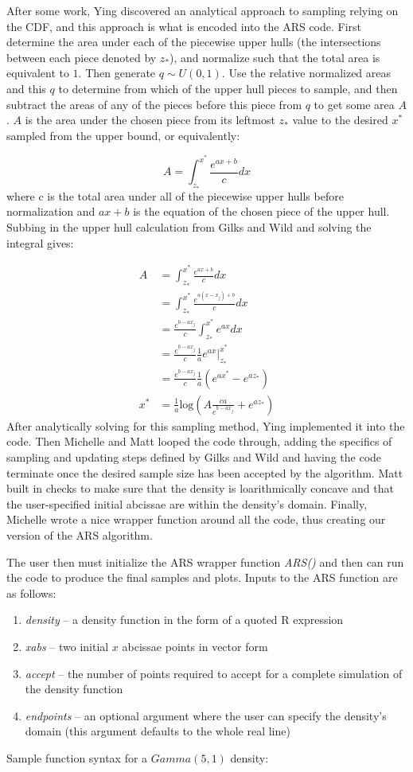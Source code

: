 \documentclass{article}
\begin{document}
After some work, Ying discovered an analytical approach to sampling relying on the CDF, and this approach is what is encoded into the ARS code.  First determine the area under each of the piecewise upper hulls (the intersections between each piece denoted by $z_*$), and normalize such that the total area is equivalent to $1$.  Then generate $q\sim U\left(0, 1\right)$.  Use the relative normalized areas and this $q$ to determine from which of the upper hull pieces to sample, and then subtract the areas of any of the pieces before this piece from $q$ to get some area $A$.  $A$ is the area under the chosen piece from its leftmost $z_*$ value to the desired $x^*$ sampled from the upper bound, or equivalently:

$$A=\int_{z_*}^{x^*}\frac{e^{ax+b}}{c}dx$$
where c is the total area under all of the piecewise upper hulls before normalization and $ax+b$ is the equation of the chosen piece of the upper hull.  Subbing in the upper hull calculation from Gilks and Wild and solving the integral gives:

\begin{align*}
A &= \int_{z_*}^{x^*}\frac{e^{ax+b}}{c}dx\\
&= \int_{z_*}^{x^*}\frac{e^{a\left(x-x_j\right)+b}}{c}dx\\
&= \frac{e^{b-ax_j}}{c}\int_{z_*}^{x^*}e^{ax}dx\\
&= \frac{e^{b-ax_j}}{c}\frac{1}{a}\left.e^{ax}\right|_{z_*}^{x^*}\\
&= \frac{e^{b-ax_j}}{c}\frac{1}{a}\left(e^{ax^*} - e^{az_*}\right)\\
x^* &= \frac{1}{a}\text{log}\left(A\frac{ca}{e^{b-ax_j}}+e^{az_*}\right)
\end{align*}
After analytically solving for this sampling method, Ying implemented it into the code.  Then Michelle and Matt looped the code through, adding the specifics of sampling and updating steps defined by Gilks and Wild and having the code terminate once the desired sample size has been accepted by the algorithm.  Matt built in checks to make sure that the density is loarithmically concave and that the user-specified initial abcissae are within the density's domain.  Finally, Michelle wrote a nice wrapper function around all the code, thus creating our version of the ARS algorithm.

The user then must initialize the ARS wrapper function \textit{ARS()} and then can run the code to produce the final samples and plots. Inputs to the ARS function are as follows:
\begin{enumerate}
\item \textit{density} -- a density function in the form of a quoted R expression
\item \textit{xabs} -- two initial $x$ abcissae points in vector form
\item \textit{accept} -- the number of points required to accept for a complete simulation of the density function
\item \textit{endpoints} -- an optional argument where the user can specify the density's domain (this argument defaults to the whole real line)
\end{enumerate}
Sample function syntax for a $Gamma\left(5,1\right)$ density:
\end{document}
